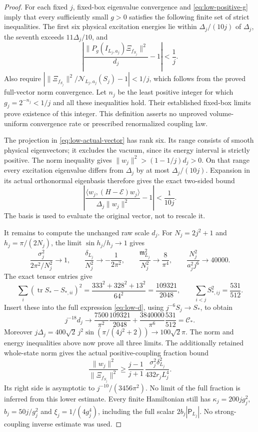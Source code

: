 \begin{proof}
For each fixed $j$, fixed-box eigenvalue convergence and
\eqref{eq:low-positive-g} imply that every sufficiently small $g>0$
satisfies the following finite set of strict inequalities.
The first six physical excitation energies lie within
$\Delta_j/(10j)$ of $\Delta_j$, the seventh exceeds
$11\Delta_j/10$, and
\[
 \left|\frac{\|P_g(I_{L_j,a_j})\Xi_{f_{S_j}}\|^2}{d_j}-1\right|<\frac1j.
\]
Also require
$|\|\Xi_{f_{S_j}}\|^2/\mathcal N_{L_j,a_j}(S_j)-1|<1/j$,
which follows from the proved full-vector norm convergence.
Let $n_j$ be the least positive integer for which $g_j=2^{-n_j}<1/j$
and all these inequalities hold. Their established fixed-box limits
prove existence of this integer. This definition asserts no unproved
volume-uniform convergence rate or prescribed renormalized coupling law.

The projection in \eqref{eq:low-actual-vector} has rank six.
Its range consists of smooth physical eigenvectors; it excludes the
vacuum, since its energy interval is strictly positive.
The norm inequality gives $\|w_j\|^2>(1-1/j)d_j>0$.
On that range every excitation eigenvalue differs from $\Delta_j$
by at most $\Delta_j/(10j)$. Expansion in its actual orthonormal
eigenbasis therefore gives the exact two-sided bound
\[
 \left|
 \frac{\langle w_j,(H-\mathcal E)w_j\rangle}{\Delta_j\|w_j\|^2}-1
 \right|<\frac1{10j}.
\]
The basis is used to evaluate the original vector, not to rescale it.

It remains to compute the unchanged raw scale $d_j$.
For $N_j=2j^2+1$ and $h_j=\pi/(2N_j)$, the limit
$\sin h_j/h_j\to1$ gives
\[
 \frac{\sigma_j^2}{2\pi^2/N_j^2}\to1,\qquad
 \frac{\delta_{L_j}}{N_j^2}\to-\frac1{2\pi^2},\qquad
 \frac{\mathfrak m_{L_j}^2}{N_j^2}\to\frac8{\pi^4},
 \qquad \frac{N_j^2}{a_j^2j^6}\to40000.
\]
The exact tensor entries give
\[
 \sum_i(\operatorname{tr}S_*-S_{*,ii})^2
 =\frac{333^2+328^2+13^2}{64^2}=\frac{109321}{2048},
 \qquad
 \sum_{i<j}S_{*,ij}^2=\frac{531}{512}.
\]
Insert these into the full expression \eqref{eq:low-d}, using
$j^{-6}S_j\to S_*$, to obtain
\[
 j^{-18}d_j\to
 \frac{7500}{\pi^2}\frac{109321}{2048}
 +\frac{3840000}{\pi^6}\frac{531}{512}=\mathcal C_* .
\]
Moreover
$j\Delta_j=400\sqrt2\,j^2\sin(\pi/(4j^2+2))
\to100\sqrt2\pi$.
The norm and energy inequalities above now prove all three limits.
The additionally retained whole-state norm gives the actual
positive-coupling fraction bound
\[
 \frac{\|w_j\|^2}{\|\Xi_{f_{S_j}}\|^2}
 \ge\frac{j-1}{j+1}\,
 \frac{\sigma_j^2\delta_{L_j}^2}{432r_jL_j^4}.
\]
Its right side is asymptotic to
$j^{-10}/(3456\pi^2)$. No limit of the full fraction is inferred
from this lower estimate.
Every finite Hamiltonian still has
$\kappa_j=200jg_j^2$, $b_j=50j/g_j^2$ and
$\xi_j=1/(4g_j^4)$, including the full scalar $2b_j|\mathsf P_{L_j}|$.
No strong-coupling inverse estimate was used.
\end{proof}

